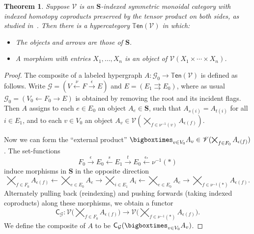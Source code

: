 \documentclass{article}
\newtheorem{thm}{Theorem}[section]
\theoremstyle{definition}
\theoremstyle{remark}
\def\G{\mathcal{G}}
\def\V{\mathscr{V}}
\def\ten{\mathbb{T}\mathsf{en}}
\let\ot\leftarrow
\let\xto\xrightarrow
\let\xot\xleftarrow
\def\bS{\ensuremath{\mathbf{S}}\xspace}
\begin{document}
\begin{thm}
  Suppose $\V$ is an \bS-indexed symmetric monoidal category with indexed homotopy coproducts preserved by the tensor product on both sides, as studied in~\cite{shulman:frbi,ps:indexed}.
  Then there is a hypercategory $\ten(\V)$ in which:
  \begin{itemize}
  \item The objects and arrows are those of \bS.
  \item A morphism with entries $X_1,\dots,X_n$ is an object of $\V(X_1\times\cdots\times X_n)$.
  \end{itemize}
\end{thm}
\begin{proof}
  The composite of a labeled hypergraph $A:\G_0\to\ten(\V)$ is defined as follows.
  Write $\G= (V\xot{\nu} F\xto{\epsilon} E)$ and $E = (E_1 \rightrightarrows E_0)$, where as usual $\G_0 = (V_0 \ot F_0 \to E)$ is obtained by removing the root and its incident flags.
  Then $A$ assigns to each $e\in E_0$ an object $A_e\in \bS$, such that $A_{s(i)}=A_{t(i)}$ for all $i\in E_1$, and to each $v\in V_0$ an object $A_v \in \V(\bigtimes_{f\in \nu^{-1}(v)} A_{\epsilon(f)})$.

  Now we can form the ``external product'' $\bigboxtimes_{v\in V_0} A_v \in \V(\bigtimes_{f\in F_0} A_{\epsilon(f)})$.
  The set-functions
  \[ F_0 \xto{\epsilon} E_0 \xot{s} E_1 \xto{t} E_0 \xot{\epsilon_\ast} \nu^{-1}(\ast) \]
  induce morphisms in \bS in the opposite direction
  \[ \bigtimes_{f\in F_0} A_{\epsilon(f)} \ot \bigtimes_{e\in E_0} A_e \to \bigtimes_{i\in E_1} A_{i} \ot \bigtimes_{e\in E_0} A_e \to \bigtimes_{f\in \nu^{-1}(\ast)} A_{\epsilon(f)}. \]
  Alternately pulling back (reindexing) and pushing forwards (taking indexed coproducts) along these morphisms, we obtain a functor
  \[ \mathsf{C}_\G : \V\Big(\bigtimes_{f\in F_0} A_{\epsilon(f)}\Big) \to \V\Big(\bigtimes_{f\in \nu^{-1}(\ast)} A_{\epsilon(f)}\Big). \]
  We define the composite of $A$ to be $\mathsf{C}_\G(\bigboxtimes_{v\in V_0} A_v)$.


\end{proof}
\end{document}
